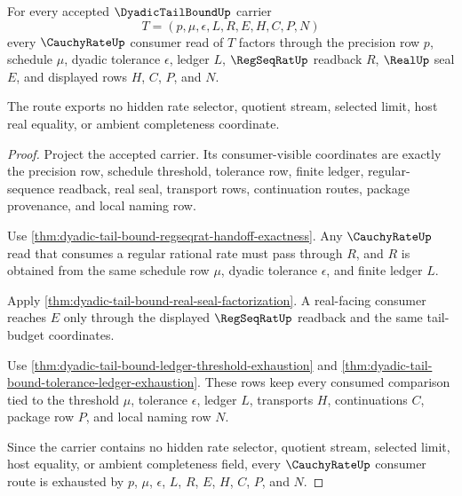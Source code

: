 \begin{theorem}
\label{thm:dyadic-tail-bound-cauchy-rate-consumer-route}
For every accepted $\DyadicTailBoundUp$ carrier
$$
T=(p,\mu,\epsilon,L,R,E,H,C,P,N)
$$
every $\CauchyRateUp$ consumer read of $T$ factors through the precision row $p$, schedule $\mu$, dyadic tolerance $\epsilon$, ledger $L$, $\RegSeqRatUp$ readback $R$, $\RealUp$ seal $E$, and displayed rows $H$, $C$, $P$, and $N$.

The route exports no hidden rate selector, quotient stream, selected limit, host real equality, or ambient completeness coordinate.
\end{theorem}
\begin{proof}
Project the accepted carrier. Its consumer-visible coordinates are exactly the precision row, schedule threshold, tolerance row, finite ledger, regular-sequence readback, real seal, transport rows, continuation routes, package provenance, and local naming row.

Use \autoref{thm:dyadic-tail-bound-regseqrat-handoff-exactness}. Any $\CauchyRateUp$ read that consumes a regular rational rate must pass through $R$, and $R$ is obtained from the same schedule row $\mu$, dyadic tolerance $\epsilon$, and finite ledger $L$.

Apply \autoref{thm:dyadic-tail-bound-real-seal-factorization}. A real-facing consumer reaches $E$ only through the displayed $\RegSeqRatUp$ readback and the same tail-budget coordinates.

Use \autoref{thm:dyadic-tail-bound-ledger-threshold-exhaustion} and \autoref{thm:dyadic-tail-bound-tolerance-ledger-exhaustion}. These rows keep every consumed comparison tied to the threshold $\mu$, tolerance $\epsilon$, ledger $L$, transports $H$, continuations $C$, package row $P$, and local naming row $N$.

Since the carrier contains no hidden rate selector, quotient stream, selected limit, host equality, or ambient completeness field, every $\CauchyRateUp$ consumer route is exhausted by $p$, $\mu$, $\epsilon$, $L$, $R$, $E$, $H$, $C$, $P$, and $N$.
\end{proof}

